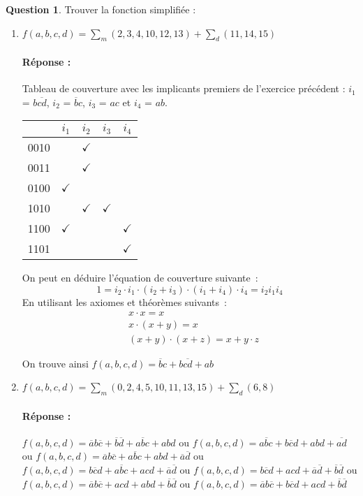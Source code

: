 \documentclass[11pt,a4paper,dvipsnames]{article}
\theoremstyle{definition}%
\newtheorem{Q}{Question}[] %
\newcommand{\reponse}[1]{%
	\ifthenelse {\boolean{corrige}} {\paragraph{Réponse :} \color{darkblue}   #1\color{black}~\\} {}
 }
\begin{document}
\begin{Q}
Trouver la fonction simplifiée :
\begin{enumerate}
	\item $f(a,b,c,d)=\sum_m(2,3,4,10,12,13)+\sum_d(11,14,15)$
	\reponse{
		Tableau de couverture avec les implicants premiers de l'exercice précédent :
		$i_1$ = $b\overline{cd}$, $i_2$ = $\overline{b}c$, $i_3$ = $ac$ et $i_4$ = $ab$.

		\begin{center}
			\begin{tabular}{ccccc}
			 & $i_1$ & $i_2$ & $i_3$ & $i_4$ \\ \hline
			 0010 & & $\checkmark$ & & \\ \hline
			 0011 & & $\checkmark$ & & \\ \hline
			 0100 & $\checkmark$ & & & \\ \hline
			 1010 & & $\checkmark$ & $\checkmark$ & \\ \hline
			 1100 & $\checkmark$ &  &  & $\checkmark$ \\ \hline
			 1101 & & & & $\checkmark$ \\ \hline
			\end{tabular}
		\end{center}

		On peut en déduire l'équation de couverture suivante~:
		\[1 = i_2 \cdot i_1 \cdot (i_2 + i_3) \cdot (i_1 + i_4) \cdot i_4 = i_2i_1i_4\]
		En utilisant les axiomes et théorèmes suivants~:
		\begin{align*}
		& x \cdot x = x\\
		& x \cdot (x + y) = x\\
		& (x + y) \cdot (x + z) = x + y \cdot z
		\end{align*}

		On trouve ainsi $f(a,b,c,d)=\overline{b}c+b\overline{cd}+ab$
	}

	\item $f(a,b,c,d)=\sum_m(0,2,4,5,10,11,13,15)+\sum_d(6,8)$
	\reponse {
		$f(a,b,c,d)=\overline{a}b\overline{c}+\overline{b}\overline{d}+a\overline{b}c+abd$
	ou $f(a,b,c,d)=a\overline{b}c+b\overline{c}d+abd+\overline{ad}$
	ou $f(a,b,c,d)=\overline{a}b\overline{c} + a\overline{b}c + abd + \overline{a}\overline{d}$
	ou $f(a,b,c,d)=b\overline{c}d + a\overline{b}c + acd + \overline{a}\overline{d}$
	ou $f(a,b,c,d)=b\overline{c}d + acd + \overline{a}\overline{d} + \overline{b}\overline{d}$
	ou $f(a,b,c,d)=\overline{a}b\overline{c} + acd + abd + \overline{b}\overline{d}$
	ou $f(a,b,c,d)=\overline{a}b\overline{c} + b\overline{c}d + acd + \overline{b}\overline{d}$
	}

\end{enumerate}

\end{Q}
\end{document}
